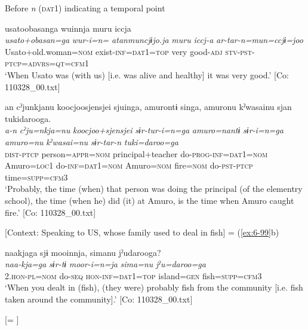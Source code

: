 \ea\label{ex:8-115}
  Before \textit{n} (\textsc{dat1}) indicating a temporal point

\ea
{\TM}
\glll  usatoobasanga  wuinnja  muru  iccja\\
\textit{usato+obasan=ga}  \textit{wur-i=n=   atanmuncjɨjo.ja}  \textit{muru}  \textit{iccj-a}      \textit{ar-tar-n=mun=ccjɨ=joo}\\
Usato+old.woman=\textsc{nom}  exist-\textsc{inf}=\textsc{dat1}=\textsc{top}  very  good-\textsc{adj} \textsc{stv}-\textsc{pst}-\textsc{ptcp}=\textsc{advrs}=\textsc{qt}=\textsc{cfm1}\\
\glt ‘When Usato was (with us) [i.e. was alive and healthy] it was very good.’ [Co: 110328\_00.txt]

\ex
{\TM}
\glll  an  cˀjunkjanu  {\textbar}koocjoosjensjei{\textbar}      sjuinga,  amurontɨ  singa,      amuronu  kˀwasainu  sjan  tukidarooga.\\
\textit{a-n}  \textit{cˀju=nkja=nu}  \textit{koocjoo+sjensjei}     \textit{sɨr-tur-i=n=ga}  \textit{amuro=nantɨ}  \textit{sɨr-i=n=ga}      \textit{amuro=nu}  \textit{kˀwasai=nu}  \textit{sɨr-tar-n}  \textit{tuki=daroo=ga}\\
\textsc{dist}-\textsc{ptcp}  person=\textsc{appr}=\textsc{nom}  principal+teacher   do-\textsc{prog}-\textsc{inf}=\textsc{dat1}=\textsc{nom}  Amuro=\textsc{loc1}  do-\textsc{inf}=\textsc{dat1}=\textsc{nom}  Amuro=\textsc{nom}  fire=\textsc{nom}  do-\textsc{pst}-\textsc{ptcp}  time=\textsc{supp}=\textsc{cfm3}\\
\glt ‘Probably, the time (when) that person was doing the principal (of the elementry school), the time (when he) did (it) at Amuro, is the time when Amuro caught fire.’ [Co: 110328\_00.txt]

\ex {}[Context: Speaking to US, whose family used to deal in fish] = (\ref{ex:6-99}b)

{\TM}
\glll  naakjaga  sjɨ  mooinnja,  simanu   jˀudarooga?\\
\textit{naa-kja=ga}  \textit{sɨr-tɨ}  \textit{moor-i=n=ja}  \textit{sima=nu}      \textit{jˀu=daroo=ga}\\
2.\textsc{hon}-\textsc{pl}=\textsc{nom}  do-\textsc{seq}  \textsc{hon}-\textsc{inf}=\textsc{dat1}=\textsc{top}  island=\textsc{gen}   fish=\textsc{supp}=\textsc{cfm3}\\
\glt ‘When you dealt in (fish), (they were) probably fish from the community [i.e. fish taken around the community].’ [Co: 110328\_00.txt]

\ex {}[= ]

